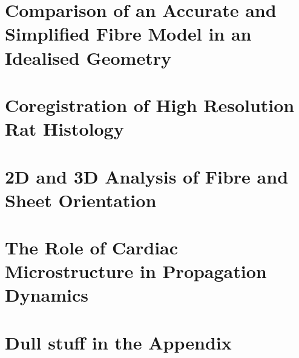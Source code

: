 \documentclass[a4paper,12pt]{report}
\begin{document}
\chapter{Comparison of an Accurate and Simplified Fibre Model in an Idealised Geometry}
\dblspace
\begin{quote}{\em }\end{quote}


%
\def\localpath{Ch6}
\chapter{Coregistration of High Resolution Rat Histology}
\dblspace
\begin{quote}{\em }\end{quote}


%
\def\localpath{Ch7}
\chapter{2D and 3D Analysis of Fibre and Sheet Orientation}
\dblspace
\begin{quote}{\em }\end{quote}


%
\def\localpath{Ch8}
\chapter{The Role of Cardiac Microstructure in Propagation Dynamics}
\dblspace
\begin{quote}{\em }\end{quote}


\appendix
\dblspace
%
\chapter{Dull stuff in the Appendix}
\def\localpath{ApA}


\sglspace

\pagestyle{bibheadings}


\end{document}
